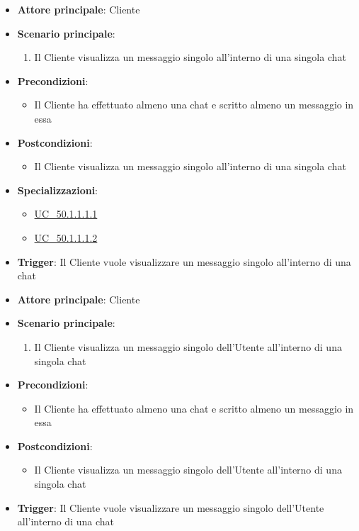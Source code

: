 \label{uc_50.1.1.1}

\begin{itemize}
	\item \textbf{Attore principale}: Cliente
	\item \textbf{Scenario principale}:
	\begin{enumerate}
		\item Il Cliente visualizza un messaggio singolo all'interno di una singola chat 
	\end{enumerate}
	\item \textbf{Precondizioni}:
	\begin{itemize}
		\item Il Cliente ha effettuato almeno una chat e scritto almeno un messaggio in essa
	\end{itemize}
	\item \textbf{Postcondizioni}:
	\begin{itemize}
		\item Il Cliente visualizza un messaggio singolo all'interno di una singola chat 
	\end{itemize}
	\item \textbf{Specializzazioni}:
	\begin{itemize}
		\item \hyperref[uc_50.1.1.1.1]{UC\_50.1.1.1.1}
		\item \hyperref[uc_50.1.1.1.2]{UC\_50.1.1.1.2}
	\end{itemize}
	\item \textbf{Trigger}: Il Cliente vuole visualizzare un messaggio singolo all'interno di una chat 
\end{itemize}

\label{uc_50.1.1.1.1}

\begin{itemize}
	\item \textbf{Attore principale}: Cliente
	\item \textbf{Scenario principale}:
	\begin{enumerate}
		\item Il Cliente visualizza un messaggio singolo dell'Utente all'interno di una singola chat 
	\end{enumerate}
	\item \textbf{Precondizioni}:
	\begin{itemize}
		\item Il Cliente ha effettuato almeno una chat e scritto almeno un messaggio in essa
	\end{itemize}
	\item \textbf{Postcondizioni}:
	\begin{itemize}
		\item Il Cliente visualizza un messaggio singolo dell'Utente all'interno di una singola chat 
	\end{itemize}
	\item \textbf{Trigger}: Il Cliente vuole visualizzare un messaggio singolo dell'Utente all'interno di una chat 
\end{itemize}


